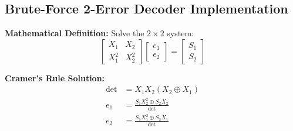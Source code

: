\documentclass[11pt,a4paper]{article}
\begin{document}
\subsection{Brute-Force 2-Error Decoder Implementation}

\textbf{Mathematical Definition:} Solve the $2 \times 2$ system:
\begin{equation}
\begin{bmatrix} X_1 & X_2 \\ X_1^2 & X_2^2 \end{bmatrix}
\begin{bmatrix} e_1 \\ e_2 \end{bmatrix} =
\begin{bmatrix} S_1 \\ S_2 \end{bmatrix}
\end{equation}

\textbf{Cramer's Rule Solution:}
\begin{align}
\det &= X_1 X_2 (X_2 \oplus X_1) \\
e_1 &= \frac{S_1 X_2^2 \oplus S_2 X_2}{\det} \\
e_2 &= \frac{S_1 X_1^2 \oplus S_2 X_1}{\det}
\end{align}
\end{document}
